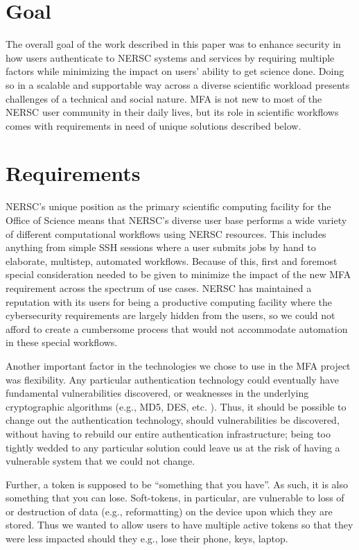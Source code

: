 \documentclass[sigconf,review]{acmart}
\begin{document}
\section{Goal}
\label{goal}

The overall goal of the work described in this paper was to enhance security in
how users authenticate to NERSC systems and services by requiring multiple
factors while minimizing the impact on users' ability to get science done. Doing
so in a scalable and supportable way across a diverse scientific workload
presents challenges of a technical and social nature. MFA is not new to most of
the NERSC user community in their daily lives, but its role in scientific
workflows comes with requirements in need of unique solutions described below.

\section{Requirements}
\label{reqs}

NERSC's unique position as the primary scientific computing facility for the
Office of Science means that NERSC's diverse user base performs a wide variety
of different computational workflows using NERSC resources. This includes
anything from simple SSH sessions where a user submits jobs by hand to
elaborate, multistep, automated workflows. Because of this, first and foremost
special consideration needed to be given to minimize the impact of the new MFA
requirement across the spectrum of use cases. NERSC has maintained a reputation
with its users for being a productive computing facility where the cybersecurity
requirements are largely hidden from the users, so we could not afford to create
a cumbersome process that would not accommodate automation in these special
workflows.

Another important factor in the technologies we chose to use in the MFA project
was flexibility. Any particular authentication technology could eventually have
fundamental vulnerabilities discovered, or weaknesses in the underlying
cryptographic algorithms (e.g., MD5, DES, etc. \cite{xie2013fast,
diffie1977special}). Thus, it should be possible to change out the
authentication technology, should vulnerabilities be discovered, without having
to rebuild our entire authentication infrastructure; being too tightly wedded to
any particular solution could leave us at the risk of having a vulnerable system
that we could not change.

Further, a token is supposed to be ``something that you have''. As such, it is
also something that you can lose. Soft-tokens, in particular, are vulnerable to
loss of or destruction of data (e.g., reformatting) on the device upon which
they are stored. Thus we wanted to allow users to have multiple active tokens so
that they were less impacted should they e.g., lose their phone, keys, laptop.
\end{document}

